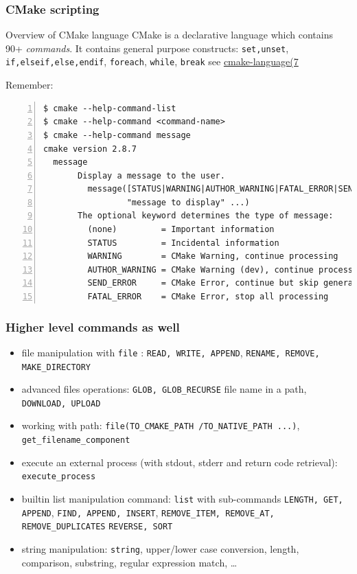 \documentclass[compress,slidestop,table,usepdftitle=false
              ]
               {beamer}
\begin{document}
\begin{frame}[fragile]
\frametitle{CMake scripting}
\begin{block}{Overview of CMake language}
CMake is a declarative language which contains 90+ \emph{commands}.
It contains general purpose constructs:
\lstinline!set,unset!,
\lstinline!if,elseif,else,endif!,
\lstinline!foreach!,
\lstinline!while!, \lstinline!break!
see \href{https://cmake.org/cmake/help/latest/manual/cmake-language.7.html}{cmake-language(7}
\end{block}
Remember:
\begin{Verbatim}[fontsize=\tiny,numbers=left]
$ cmake --help-command-list
$ cmake --help-command <command-name>
$ cmake --help-command message
cmake version 2.8.7
  message
       Display a message to the user.
         message([STATUS|WARNING|AUTHOR_WARNING|FATAL_ERROR|SEND_ERROR]
                 "message to display" ...)
       The optional keyword determines the type of message:
         (none)         = Important information
         STATUS         = Incidental information
         WARNING        = CMake Warning, continue processing
         AUTHOR_WARNING = CMake Warning (dev), continue processing
         SEND_ERROR     = CMake Error, continue but skip generation
         FATAL_ERROR    = CMake Error, stop all processing
\end{Verbatim}
\end{frame}

\begin{frame}[fragile]
\frametitle{Higher level commands as well}
\lstset{basicstyle=\scriptsize}
\begin{itemize}
\item file manipulation with \lstinline[basicstyle=\normalsize]!file! : \lstinline!READ, WRITE, APPEND!,
      \lstinline!RENAME, REMOVE, MAKE_DIRECTORY!
      
\item advanced files operations: \lstinline!GLOB, GLOB_RECURSE! file name in a path,
      \lstinline!DOWNLOAD, UPLOAD!
\item working with path: \lstinline[basicstyle=\normalsize]!file!\lstinline!(TO_CMAKE_PATH /TO_NATIVE_PATH ...)!, \lstinline[basicstyle=\normalsize]!get_filename_component!
\item execute an external process (with stdout, stderr and return code retrieval): \lstinline[basicstyle=\normalsize]!execute_process!
\item builtin list manipulation command: \lstinline[basicstyle=\normalsize]!list! with sub-commands
      \lstinline!LENGTH, GET, APPEND!,
      \lstinline!FIND, APPEND, INSERT!,
      \lstinline!REMOVE_ITEM, REMOVE_AT, REMOVE_DUPLICATES!
      \lstinline!REVERSE, SORT!
\item string manipulation: \lstinline[basicstyle=\normalsize]!string!, upper/lower case conversion, length, comparison,
      substring, regular expression match, \ldots
\end{itemize}
\lstset{basicstyle=\normalsize}
\end{frame}
\end{document}
